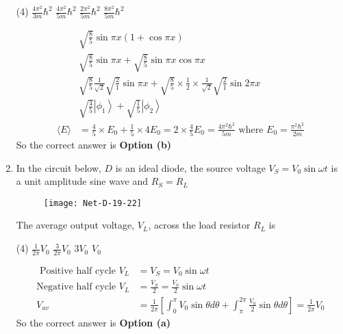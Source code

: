 \begin{enumerate}
 \begin{tasks}(4)
	\task[\textbf{a.}] $\frac{4 \pi^{2}}{3 m} \hbar^{2}$
	\task[\textbf{b.}]$\frac{4 \pi^{2}}{5 m} \hbar^{2}$
	\task[\textbf{c.}]$\frac{2 \pi^{2}}{5 m} \hbar^{2}$
	\task[\textbf{d.}]  $\frac{8 \pi^{2}}{5 m} \hbar^{2}$
\end{tasks}
\begin{answer}
	\begin{align*}
	&\sqrt{\frac{8}{5}} \sin \pi x(1+\cos \pi x)\\
	&\sqrt{\frac{8}{5}} \sin \pi x+\sqrt{\frac{8}{5}} \sin \pi x \cos \pi x \\
	&\sqrt{\frac{8}{5}} \frac{1}{\sqrt{2}} \sqrt{\frac{2}{1}} \sin \pi x+\sqrt{\frac{8}{5}} \times \frac{1}{2} \times \frac{1}{\sqrt{2}} \sqrt{\frac{2}{1}} \sin 2 \pi x \\
	&\sqrt{\frac{4}{5}}\left|\phi_{1}\right\rangle+\sqrt{\frac{1}{5}}\left|\phi_{2}\right\rangle\\
	\langle E\rangle&=\frac{4}{5} \times E_{0}+\frac{1}{5} \times 4 E_{0}=2 \times \frac{4}{5} E_{0}=\frac{4 \pi^{2} \hbar^{2}}{5 m} \text { where } E_{0}=\frac{\pi^{2} \hbar^{2}}{2 m}
	\end{align*}
			So the correct answer is \textbf{Option (b)}
\end{answer}
\item In the circuit below, $D$ is an ideal diode, the source voltage $V_{S}=V_{0} \sin \omega t$ is a unit amplitude sine wave and $R_{S}=R_{L}$	
\begin{figure}[H]
	\centering
	\texttt{[image: Net-D-19-22]}
\end{figure}
The average output voltage, $V_{L}$, across the load resistor $R_{L}$ is
 \begin{tasks}(4)
	\task[\textbf{a.}] $\frac{1}{2 \pi} V_{0}$
	\task[\textbf{b.}] $\frac{3}{2 \pi} V_{0}$
	\task[\textbf{c.}]$3 V_{0}$
	\task[\textbf{d.}]$V_{0}$ 
\end{tasks}
\begin{answer}
	\begin{align*}
	\text { Positive half cycle } V_{L}&=V_{S}=V_{0} \sin \omega t\\
	\text{Negative half cycle }V_{L}&=\frac{V_{S}}{2}=\frac{V_{0}}{2} \sin \omega t\\
	V_{a v}&=\frac{1}{2 \pi}\left[\int_{0}^{\pi} V_{0} \sin \theta d \theta+\int_{\pi}^{2 \pi} \frac{V_{0}}{2} \sin \theta d \theta\right]=\frac{1}{2 \pi} V_{0}
	\end{align*}
		So the correct answer is \textbf{Option (a)}

\end{answer}
\end{enumerate}
